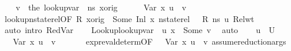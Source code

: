 \begin{isabellebody}
\ \ \isamarkupfalse%
\ {\isacharquery}{\kern0pt}v\ {\isacharequal}{\kern0pt}\ {\isachardoublequoteopen}{\isacharparenleft}{\kern0pt}the\ {\isacharparenleft}{\kern0pt}lookup{\isacharunderscore}{\kern0pt}var\ {\isasymLambda}\ ns\ x{\isacharunderscore}{\kern0pt}orig{\isacharparenright}{\kern0pt}{\isacharparenright}{\kern0pt}{\isachardoublequoteclose}\isanewline
\ \ \isamarkupfalse%
\ {\isachardoublequoteopen}{\isasymLambda}{\isacharprime}{\kern0pt}{\isacharcomma}{\kern0pt}{\isasymGamma}{\isacharcomma}{\kern0pt}{\isasymOmega}\ {\isasymturnstile}\ {\isasymlangle}Var\ x{}{\isacharcomma}{\kern0pt}\ u{\isacharprime}{\kern0pt}{\isasymrangle}\ {\isasymDown}\ {\isacharquery}{\kern0pt}v{\isachardoublequoteclose}\isanewline
\ \ \ \ \isamarkupfalse%
\ lookup{\isacharunderscore}{\kern0pt}nstate{\isacharunderscore}{\kern0pt}rel{\isacharbrackleft}{\kern0pt}OF\ {\isacartoucheopen}R\ x{\isacharunderscore}{\kern0pt}orig\ {\isacharequal}{\kern0pt}\ Some\ {\isacharparenleft}{\kern0pt}Inl\ x{}{\isacharparenright}{\kern0pt}{\isacartoucheclose}\ {\isacartoucheopen}nstate{\isacharunderscore}{\kern0pt}rel\ {\isasymLambda}\ {\isasymLambda}{\isacharprime}{\kern0pt}\ R\ ns\ u{\isacharprime}{\kern0pt}{\isacartoucheclose}\ Rel{\isacharunderscore}{\kern0pt}wt{\isacharbrackright}{\kern0pt}\isanewline
\ \ \ \ \isamarkupfalse%
\ {\isacharparenleft}{\kern0pt}auto\ intro{\isacharcolon}{\kern0pt}\ RedVar{\isacharparenright}{\kern0pt}\isanewline
\ \ \isamarkupfalse%
\ Lookup{}{\isacharcolon}{\kern0pt}{\isachardoublequoteopen}lookup{\isacharunderscore}{\kern0pt}var\ {\isasymLambda}{\isacharprime}{\kern0pt}\ u{\isacharprime}{\kern0pt}\ x{}\ {\isacharequal}{\kern0pt}\ Some\ {\isacharquery}{\kern0pt}v{\isachardoublequoteclose}\ \isamarkupfalse%
\ auto\isanewline
\ \ \isamarkupfalse%
\ {\isacartoucheopen}u{\isacharprime}{\kern0pt}\ {\isasymin}\ {\isacharquery}{\kern0pt}U{\isacharprime}{\kern0pt}{\isacartoucheclose}\ \isamarkupfalse%
\ {\isachardoublequoteopen}{\isasymLambda}{\isacharprime}{\kern0pt}{\isacharcomma}{\kern0pt}{\isasymGamma}{\isacharcomma}{\kern0pt}{\isasymOmega}\ {\isasymturnstile}\ {\isasymlangle}Var\ x{}{\isacharcomma}{\kern0pt}\ u{\isacharprime}{\kern0pt}{\isasymrangle}\ {\isasymDown}\ {\isacharquery}{\kern0pt}v{\isachardoublequoteclose}\ \isanewline
\ \ \ \isamarkupfalse%
\ \ expr{\isacharunderscore}{\kern0pt}eval{\isacharunderscore}{\kern0pt}determ{\isacharparenleft}{\kern0pt}{}{\isacharparenright}{\kern0pt}{\isacharbrackleft}{\kern0pt}OF\ {\isacartoucheopen}{\isasymLambda}{\isacharprime}{\kern0pt}{\isacharcomma}{\kern0pt}{\isasymGamma}{\isacharcomma}{\kern0pt}{\isasymOmega}\ {\isasymturnstile}\ {\isasymlangle}Var\ x{}{\isacharcomma}{\kern0pt}\ u{\isacharprime}{\kern0pt}{\isasymrangle}\ {\isasymDown}\ {\isacharquery}{\kern0pt}v{\isacartoucheclose}{\isacharbrackright}{\kern0pt}\ assume{\isacharunderscore}{\kern0pt}reduction{\isacharunderscore}{\kern0pt}args\ \isamarkupfalse%

\end{isabellebody}
